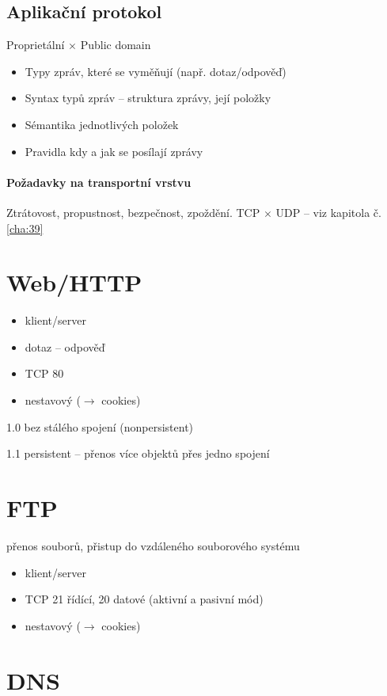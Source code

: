 \documentclass[a4paper, 11pt]{report}
\begin{document}
\subsection{Aplikační protokol}
Proprietální $\times$ Public domain
\begin{itemize}
	\item Typy zpráv, které se vyměňují (např. dotaz/odpověď)
	\item Syntax typů zpráv -- struktura zprávy, její položky
	\item Sémantika jednotlivých položek
	\item Pravidla kdy a jak se posílají zprávy
\end{itemize}

\paragraph{Požadavky na transportní vrstvu} Ztrátovost, propustnost, bezpečnost, zpoždění. TCP $\times$ UDP -- viz kapitola č. \ref{cha:39}

\section{Web/HTTP}
\begin{itemize}
	\item klient/server
	\item dotaz -- odpověď
	\item TCP 80
	\item nestavový ($\to$ cookies)
\end{itemize}

1.0 bez stálého spojení (nonpersistent)

1.1 persistent -- přenos více objektů přes jedno spojení

\section{FTP}
přenos souborů, přistup do vzdáleného souborového systému

\begin{itemize}
	\item klient/server
	\item TCP 21 řídící, 20 datové (aktivní a pasivní mód)
	\item nestavový ($\to$ cookies)
\end{itemize}

\section{DNS}
\end{document}
